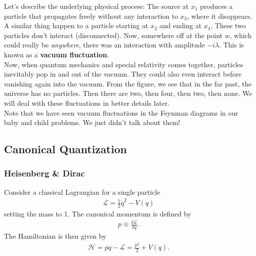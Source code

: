 \documentclass{book}
\theoremstyle{definition}
\newcommand{\lag}{\mathcal{L}}
\newcommand{\ham}{\mathcal{H}}
\newcommand{\f}[2]{\frac{#1}{#2}}
\begin{document}
Let's describe the underlying physical process: The source at $x_1$ produces a particle that propagates freely without any interaction to $x_3$, where it disappears. A similar thing happen to a particle starting at $x_2$ and ending at $x_4$. These two particles don't interact (disconnected). Now, somewhere off at the point $w$, which could really be \textit{anywhere}, there was an interaction with amplitude $-i\lambda$. This is known as a \textbf{vacuum fluctuation}.\\


Now, when quantum mechanics and special relativity comes together, particles inevitably pop in and out of the vacuum. They could also even interact before vanishing again into the vacuum. From the figure, we see that in the far past, the universe has no particles. Then there are two, then four, then two, then none. We will deal with these fluctuations in better details later. \\

Note that we have seen vacuum fluctuations in the Feynman diagrams in our baby and child problems. We just didn't talk about them!











\newpage









\subsection{Canonical Quantization}




\subsubsection{Heisenberg \& Dirac}


Consider a classical Lagrangian for a single particle
\begin{align}
\boxed{\lag = \f{1}{2}\dot{q}^2 - V(q)}
\end{align}
setting the mass to 1. The canonical momentum is defined by
\begin{align}
p \equiv \f{\delta \lag }{\delta \dot{q}}.
\end{align}
The Hamiltonian is then given by
\begin{align}\label{hamilton}
\ham = p\dot{q} - \lag = \f{p^2}{2} + V(q).
\end{align}
\end{document}
